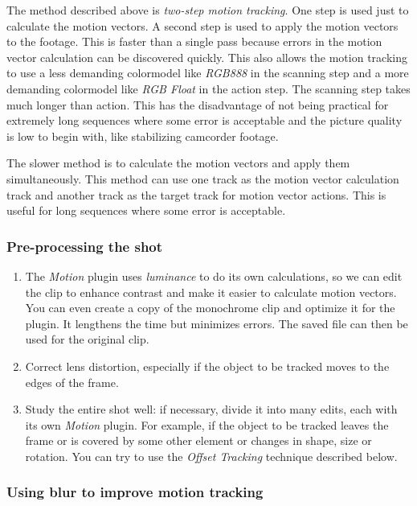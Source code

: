 The method described above is \textit{two-step motion tracking}. One step is used just to calculate the motion vectors. A second step is used to apply the motion vectors to the footage. This is faster than a single pass because errors in the motion vector calculation can be discovered quickly. This also allows the motion tracking to use a less demanding colormodel like \textit{RGB888} in the scanning step and a more demanding colormodel like \textit{RGB Float} in the action step. The scanning step takes much longer than action. This has the disadvantage of not being practical for extremely long sequences where some error is acceptable and the picture quality is low to begin with, like stabilizing camcorder footage.

The slower method is to calculate the motion vectors and apply them simultaneously. This method can use one track as the motion vector calculation track and another track as the target track for motion vector actions. This is useful for long sequences where some error is acceptable.

\subsubsection*{Pre-processing the shot}
\label{ssub:pre_processing_shot}

\begin{enumerate}
    \item The \textit{Motion} plugin uses \textit{luminance} to do its own calculations, so we can edit the clip to enhance contrast and make it easier to calculate motion vectors. You can even create a copy of the monochrome clip and optimize it for the plugin. It lengthens the time but minimizes errors. The saved file can then be used for the original clip.
    \item  Correct lens distortion, especially if the object to be tracked moves to the edges of the frame.
    \item Study the entire shot well: if necessary, divide it into many edits, each with its own \textit{Motion} plugin. For example, if the object to be tracked leaves the frame or is covered by some other element or changes in shape, size or rotation. You can try to use the \textit{Offset Tracking} technique described below.
\end{enumerate}

\subsubsection*{Using blur to improve motion tracking}
\label{ssub:blur_improve_motion_tracking}

